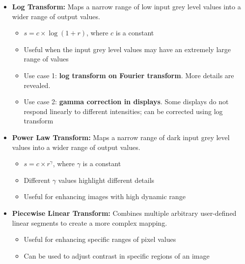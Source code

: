 \begin{itemize}
  \item \textbf{Log Transform:} Maps a narrow range of low input grey
    level values into a wider range of output values.
    \begin{itemize}
      \item $s = c \times \log(1 + r)$, where $c$ is a constant
      \item Useful when the input grey level values may have an
        extremely large range of values
      \item Use case 1: \textbf{log transform on Fourier transform}.
        More details are revealed.
      \item Use case 2: \textbf{gamma correction in displays}. Some
        displays do not respond linearly to different intensities;
        can be corrected using log transform
    \end{itemize}

  \item \textbf{Power Law Transform:} Maps a narrow range of dark
    input grey level values into a wider range of output values.
    \begin{itemize}
      \item $s = c \times r^{\gamma}$, where $\gamma$ is a constant
      \item Different $\gamma$ values highlight different details
      \item Useful for enhancing images with high dynamic range
    \end{itemize}

  \item \textbf{Piecewise Linear Transform:} Combines multiple
    arbitrary user-defined linear segments to create a more complex mapping.
    \begin{itemize}
      \item Useful for enhancing specific ranges of pixel values
      \item Can be used to adjust contrast in specific regions of an image
    \end{itemize}


\end{itemize}
